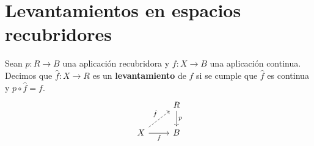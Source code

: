 \begin{ejemplo}
\begin{enumerate}
\begin{figure}[H]
%
        \end{figure}%

    \end{enumerate}
\end{ejemplo}

\section{Levantamientos en espacios recubridores}



\begin{definicion}
    Sean $p:R\to B$ una aplicación recubridora y $f:X\to B$ una aplicación continua. Decimos que $\hat{f}:X\to R$ es un \textbf{levantamiento} de $f$ si se cumple que $\hat{f}$ es continua y $p\circ \hat{f} = f$. 
    \[
    \begin{tikzcd}
        & R \arrow[d, "p"] \\
        X \arrow[ur, dashed, "\hat{f}"] \arrow[r, "f"'] & B
    \end{tikzcd}
    \]
\end{definicion}

